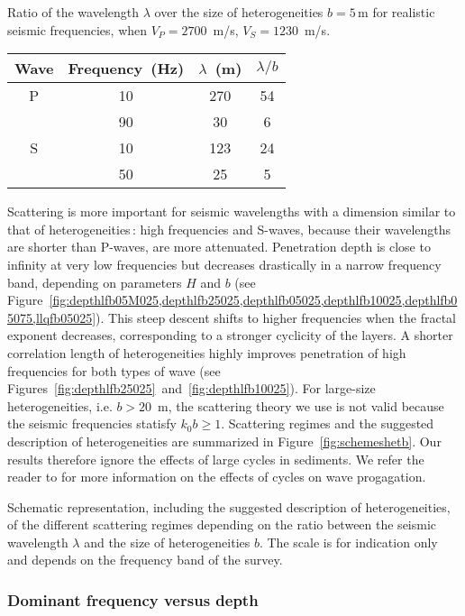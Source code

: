 {Ratio of the wavelength $\lambda$ over the size of heterogeneities $b=5$\,m for realistic seismic frequencies,
when $V_P=2700$~m/s, $V_S=1230$~m/s.}
{
\begin{center}
\begin{tabular}{|c|c|c|c|}
\hline
Wave & Frequency~(Hz) & $\lambda$~(m) & $\lambda/b$ \\
\hline
P & 10  & 270 & 54 \\
  & 90  & 30  &  6 \\ \hline
S & 10  & 123 & 24 \\
  & 50  & 25  &  5 \\
\hline
\end{tabular}
\end{center}
}

Scattering is more important for seismic wavelengths with a dimension
similar to that of heterogeneities\,: high frequencies and S-waves,
because their wavelengths are shorter than P-waves, are more
attenuated.  Penetration depth is close to infinity at very low
frequencies but decreases drastically in a narrow frequency band,
depending on parameters $H$ and $b$ (see
Figure~\ref{fig:depthlfb05M025,depthlfb25025,depthlfb05025,depthlfb10025,depthlfb05075,llqfb05025}).
This steep descent shifts to higher frequencies when the fractal
exponent decreases, corresponding to a stronger cyclicity of the
layers.  A shorter correlation length of heterogeneities highly
improves penetration of high frequencies for both types of wave (see
Figures~\ref{fig:depthlfb25025}~and~\ref{fig:depthlfb10025}).  For
large-size heterogeneities, i.e. $b>20$~m, the scattering theory we
use is not valid because the seismic frequencies statisfy $k_0b\geq
1$.  Scattering regimes and the suggested description of
heterogeneities are summarized in Figure~\ref{fig:schemeshetb}.  Our
results therefore ignore the effects of large cycles in sediments.  We
refer the reader to \cite{Stovas_U07} for more information on the
effects of cycles on wave progagation.

{Schematic representation, including the suggested description of heterogeneities, 
of the different scattering regimes depending on the ratio between
the seismic wavelength $\lambda$ and the size of heterogeneities $b$.
The scale is for indication only and depends on the frequency band of the survey.}

\subsubsection{Dominant frequency versus depth}

